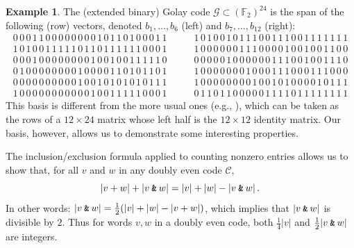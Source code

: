 \documentclass{article}
\theoremstyle{plain}
\theoremstyle{definition}
\newtheorem{example}{Example}
\def \cC {\mathcal{C}}
\def \cG {\mathcal{G}}
\def \FF {\mathbb{F}}
\newcommand{\AND}{\mathbin{\textup{\texttt{\&}}}}
\begin{document}
\begin{example}\label{example:Golay}
The (extended binary) Golay code $\cG \subset (\FF_2)^{24}$ is the span of the following (row) vectors, denoted $b_1,\ldots,b_6$ (left) and $b_7,\ldots,b_{12}$ (right):
\[	
	 \begin{array}{c}
     0\,0\,0\,1\,1\,0\,0\,0\,0\,0\,0\,0\,0\,1\,0\,1\,1\,0\,1\,0\,0\,0\,1\,1 \\
     1\,0\,1\,0\,0\,1\,1\,1\,1\,1\,0\,1\,1\,0\,1\,1\,1\,1\,1\,1\,0\,0\,0\,1 \\
     0\,0\,0\,1\,0\,0\,0\,0\,0\,0\,0\,0\,1\,0\,0\,1\,0\,0\,1\,1\,1\,1\,1\,0 \\
     0\,1\,0\,0\,0\,0\,0\,0\,0\,0\,1\,0\,0\,0\,0\,1\,1\,0\,1\,0\,1\,1\,0\,1 \\
     0\,0\,0\,0\,0\,0\,0\,0\,0\,0\,1\,0\,0\,1\,0\,1\,0\,1\,0\,1\,0\,1\,1\,1 \\
     1\,0\,0\,0\,0\,0\,0\,0\,0\,0\,0\,0\,1\,0\,0\,1\,1\,1\,1\,1\,0\,0\,0\,1
     \end{array}
\qquad
    \begin{array}{c}
	 1\,0\,1\,0\,0\,1\,0\,1\,1\,1\,0\,0\,1\,1\,1\,0\,0\,1\,1\,1\,1\,1\,1\,1 \\
	 1\,0\,0\,0\,0\,0\,0\,1\,1\,1\,0\,0\,0\,0\,1\,0\,0\,1\,0\,0\,1\,1\,0\,0 \\
	 0\,0\,0\,0\,0\,1\,0\,0\,0\,0\,0\,0\,1\,1\,1\,0\,0\,1\,0\,0\,1\,1\,1\,0 \\
	 1\,0\,0\,0\,0\,0\,0\,0\,1\,0\,0\,0\,1\,1\,1\,0\,0\,0\,1\,1\,1\,0\,0\,0 \\
	 1\,0\,0\,0\,0\,0\,0\,0\,0\,1\,0\,0\,1\,0\,1\,0\,0\,0\,0\,1\,0\,1\,1\,1 \\
	 0\,1\,1\,0\,1\,1\,0\,0\,0\,0\,0\,1\,1\,1\,1\,0\,1\,1\,1\,1\,1\,1\,1\,1
	 \end{array}
\]
This basis is different from the more usual ones (e.g., \cite[Figure 3.4]{SPLAG}), which can be taken as the rows of a $12\times 24$ matrix whose left half is the $12\times 12$ identity matrix.
Our basis, however, allows us to demonstrate some interesting properties.
\end{example}

The inclusion/exclusion formula applied to counting nonzero entries allows us to show that, for all $v$ and $w$ in any doubly even code $\cC$,
\[
	|v+w| + |v\AND w| = |v| + |w| - |v\AND w|\,.
\]
In other words: $|v\AND w| = \frac12(|v| + |w| - |v+w|)$, which implies that $|v\AND w|$ is divisible by $2$.
Thus for words $v,w$ in a doubly even code, both $\frac14|v|$ and $\frac12|v\AND w|$ are integers.
\end{document}
